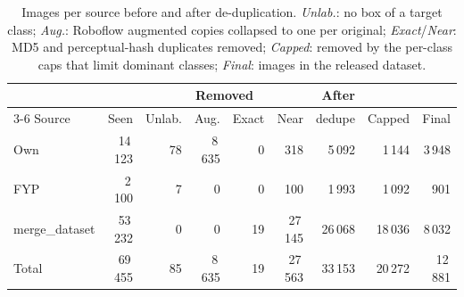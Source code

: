 \begin{table}[t]
\centering
\caption{Images per source before and after de-duplication. \emph{Unlab.}: no box of a target class; \emph{Aug.}: Roboflow augmented copies collapsed to one per original; \emph{Exact}/\emph{Near}: MD5 and perceptual-hash duplicates removed; \emph{Capped}: removed by the per-class caps that limit dominant classes; \emph{Final}: images in the released dataset.}
\label{tab:sources}
\footnotesize
\setlength{\tabcolsep}{3pt}
\begin{tabular}{@{}lrrrrrrrr@{}}
\toprule
 & & \multicolumn{4}{c}{Removed} & After & & \\
\cmidrule(lr){3-6}
Source & Seen & Unlab. & Aug. & Exact & Near & dedupe & Capped & Final \\
\midrule
Own & 14\,123 & 78 & 8\,635 & 0 & 318 & 5\,092 & 1\,144 & 3\,948 \\
FYP & 2\,100 & 7 & 0 & 0 & 100 & 1\,993 & 1\,092 & 901 \\
merge\_dataset & 53\,232 & 0 & 0 & 19 & 27\,145 & 26\,068 & 18\,036 & 8\,032 \\
\midrule
Total & 69\,455 & 85 & 8\,635 & 19 & 27\,563 & 33\,153 & 20\,272 & 12\,881 \\
\bottomrule
\end{tabular}
\end{table}
